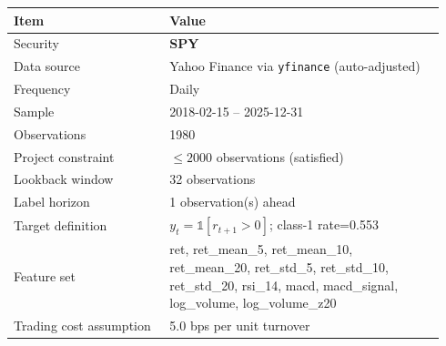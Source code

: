 \begin{table}[H]
\centering
\small
\begin{tabular}{p{0.34\linewidth} p{0.60\linewidth}}
\toprule
\textbf{Item} & \textbf{Value}\\
\midrule
Security & \textbf{SPY}\\
Data source & Yahoo Finance via \texttt{yfinance} (auto-adjusted)\\
Frequency & Daily\\
Sample & 2018-02-15 -- 2025-12-31\\
Observations & 1980\\
Project constraint & $\leq 2000$ observations (satisfied)\\
Lookback window & 32 observations\\
Label horizon & 1 observation(s) ahead\\
Target definition & $y_t=\mathbb{1}[r_{t+1}>0]$; class-1 rate=0.553\\
Feature set & ret, ret\_mean\_5, ret\_mean\_10, ret\_mean\_20, ret\_std\_5, ret\_std\_10, ret\_std\_20, rsi\_14, macd, macd\_signal, log\_volume, log\_volume\_z20\\
Trading cost assumption & 5.0 bps per unit turnover\\
\bottomrule
\end{tabular}
\end{table}

